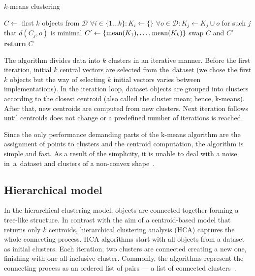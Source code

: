 \begin{algorithm}[t]
	\caption{$k$-means clustering}
	\label{alg01:kmeans}
	\begin{algorithmic}[1]
		\State $C \gets$ first $k$ objects from  $\mathcal{D}$ 
		\Repeat
			\State $\forall i \in \{1\dots k\}:K_i \gets \{\}$  
			\State $\forall o \in \mathcal{D}:K_{j} \gets K_{j} \cup o$ for such $j$ that $d(C_j,o)$ is minimal 
			\State $C' \gets \{\operatorname{mean}(K_1),\dots,\operatorname{mean}(K_k)\}$
			\State swap $C$ and $C'$
		\State \textbf{return} $C$
		\EndProcedure
	\end{algorithmic}
\end{algorithm}


The algorithm divides data into $k$ clusters in an iterative manner. Before the first iteration, initial $k$ central vectors are selected from the~dataset (we chose the first $k$ objects but the way of selecting $k$ initial vectors varies between 
implementations). In the iteration loop, dataset objects are grouped into clusters according to the closest centroid (also called the cluster mean; hence, k-means). After that, new centroids are computed from new clusters. Next iteration follows until centroids does not change or a predefined number of iterations is reached. 

Since the only performance demanding parts of the k-means algorithm are the assignment of points to clusters and the centroid computation, the algorithm is simple and fast. As a result of the simplicity, it is unable to deal with a noise in~a~dataset and clusters of a non-convex shape~\cite{uppada2014centroid}.
  

\subsection{Hierarchical model}
\label{sec01:hierarch_clust}

In the hierarchical clustering model, objects are connected together forming a tree-like structure. In contrast with the aim of a centroid-based model that returns only $k$ centroids, hierarchical clustering analysis (HCA) captures the whole connecting process. HCA algorithms start with all objects from a dataset as initial clusters. Each iteration, two clusters are connected creating a new one, finishing with one all-inclusive cluster. Commonly, the algorithms represent the connecting process as an ordered list of pairs --- a list of connected clusters~\cite{karypis1999chameleon}.

